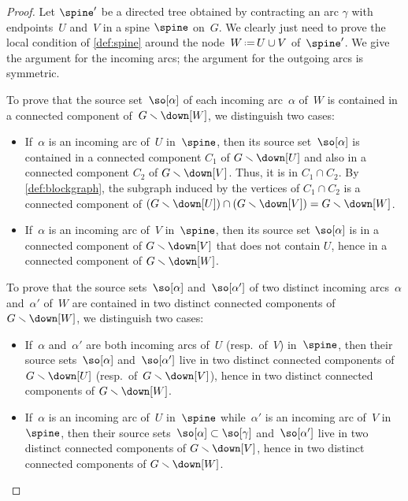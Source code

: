 \documentclass{amsart}
\theoremstyle{definition}
\newcommand{\ssm}{\smallsetminus} %
\newcommand{\eqdef}{\mbox{\,\raisebox{0.2ex}{\scriptsize\ensuremath{\mathrm:}}\ensuremath{=}\,}} %
\begin{document}
\begin{proof} 
  Let $\spine'$ be a directed tree obtained by contracting an arc $\gamma$ with endpoints~$U$ and~$V$ in a spine $\spine$ on~$G$.
  We clearly just need to prove the local condition of \cref{def:spine} around the node~$W \eqdef U \cup V$ of~$\spine'$.
  We give the argument for the incoming arcs; the argument for the outgoing arcs is symmetric. 

  To prove that the source set~$\so[\alpha]$ of each incoming arc~$\alpha$ of~$W$ is contained in a connected component of~$G \ssm \down[W]$, we distinguish two cases:
  \begin{itemize}
    \item If~$\alpha$ is an incoming arc of~$U$ in~$\spine$, then its source set~$\so[\alpha]$ is contained in a connected component $C_1$ of $G \ssm \down[U]$ and also in a connected component $C_2$ of $G \ssm \down[V]$. Thus, it is in $C_1 \cap C_2$. By \cref{def:blockgraph}, the subgraph induced by the vertices of $C_1 \cap C_2$ is a connected component of $(G \ssm \down[U]) \cap (G \ssm \down[V]) = G \ssm \down[W]$.
    \item If~$\alpha$ is an incoming arc of~$V$ in~$\spine$, then its source set $\so[\alpha]$ is in a connected component of $G \ssm \down[V]$ that does not contain $U$, hence in a connected component of $G \ssm \down[W]$.
  \end{itemize}

  To prove that the source sets~$\so[\alpha]$ and~$\so[\alpha']$ of two distinct incoming arcs~$\alpha$ and~$\alpha'$ of~$W$ are contained in two distinct connected components of~$G \ssm \down[W]$, we distinguish two cases:
  \begin{itemize}
    \item If~$\alpha$ and~$\alpha'$ are both incoming arcs of~$U$ (resp.~of~$V$) in~$\spine$, then their source sets~$\so[\alpha]$ and~$\so[\alpha']$ live in two distinct connected components of $G \ssm \down[U]$ (resp.~of~$G \ssm \down[V]$), hence in two distinct connected components of $G\ssm \down[W]$.
    \item If~$\alpha$ is an incoming arc of~$U$ in~$\spine$ while~$\alpha'$ is an incoming arc of~$V$ in~$\spine$, then their source sets~$\so[\alpha] \subset \so[\gamma]$ and~$\so[\alpha']$ live in two distinct connected components of $G \ssm \down[V]$, hence in two distinct connected components of $G\ssm \down[W]$.
    \qedhere
  \end{itemize}
\end{proof}
\end{document}
